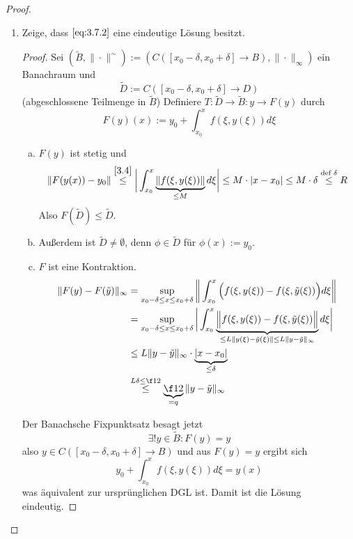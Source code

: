 \begin{st}
\begin{proof}
\begin{enumerate}[1)]
\begin{proof}
\begin{seg}
					\end{seg}
				\end{proof}
			\item
				Zeige, dass $\eqref{eq:3.7.2}$ eine eindeutige Lösung besitzt.
				\begin{proof}
					Sei $(\tilde B, \|\cdot\|^{\sim}) := (C([x_0-\delta, x_0+\delta] \to B), \|\cdot\|_\infty)$ ein Banachraum und
					\[
						\tilde D := C([x_0 -\delta, x_0 + \delta] \to D) 
					\]
					(abgeschlossene Teilmenge in $\tilde B$)
					Definiere $T: \tilde D \to \tilde B : y \to F(y)$ durch
					\[
						F(y)(x) := y_0 + \int_{x_0}^x f(\xi, y(\xi)) d\xi
					\]
					\begin{enumerate}[a)]
						\item
							$F(y)$ ist stetig und
							\[
								\|F(y(x)) - y_0 \|
								\stackrel{\ref{3.4}}\le \bigg| \int_{x_0}^x \underbrace{\|f(\xi, y(\xi))\|}_{\le M} d\xi \bigg|
								\le M \cdot |x - x_0|
								\le M \cdot \delta
								\stackrel{\text{def } \delta}\le R
							\]
							Also $F(\tilde D ) \le \tilde D$.
						\item
							Außerdem ist $\tilde D \neq \emptyset$, denn $\phi \in \tilde D$ für $\phi(x) := y_0$.
						\item
							$F$ ist eine Kontraktion.
							\begin{align*}
								\|F(y) - F(\tilde y)\|_\infty
								&= \sup_{x_0-\delta \le x \le x_0+\delta} \bigg\| \int_{x_0}^x \Big( f(\xi, y(\xi)) - f(\xi, \tilde y(\xi)) \Big) d\xi \bigg\| \\
								&= \sup_{x_0-\delta \le x \le x_0+\delta} \bigg| \int_{x_0}^x \underbrace{\Big\| f(\xi, y(\xi)) - f(\xi, \tilde y(\xi)) \Big\|}_{\le L \|y(\xi)-\tilde y(\xi)\| \le L \|y-\tilde y\|_\infty} d\xi \bigg| \\
								&\le L \|y-\tilde y\|_\infty \cdot \underbrace{|x-x_0|}_{\le \delta} \\
								&\stackrel{L \delta \le \f 12} \le \underbrace{\f 12}_{=q} \|y-\tilde y\|_\infty
							\end{align*}
					\end{enumerate}
					Der Banachsche Fixpunktsatz besagt jetzt
					\[
						\exists! y \in \tilde B : F(y) = y
					\]
					also $y \in C([x_0-\delta, x_0+\delta] \to B)$ und aus $F(y) = y$ ergibt sich
					\[
						y_0  + \int_{x_0}^x f(\xi, y(\xi)) d \xi = y(x)
					\]
					was äquivalent zur ursprünglichen DGL ist.
					Damit ist die Lösung eindeutig.
				\end{proof}
		\end{enumerate}
	\end{proof}
\end{st}


